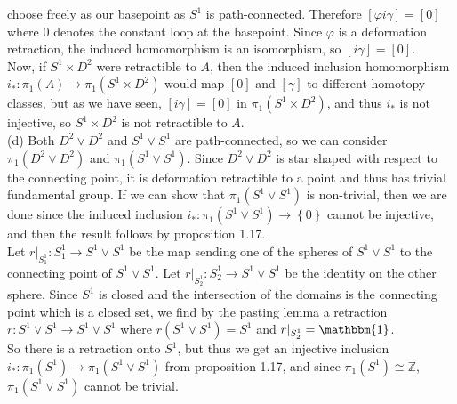 \documentclass[a4paper]{article}
\begin{document}
     choose freely as our basepoint as $S^{1}$ is path-connected. Therefore
     $\left[ \varphi i \gamma \right] = \left[ 0 \right] $ where $0$ denotes
     the constant loop at the basepoint. Since $\varphi$ is
     a deformation retraction, the induced homomorphism is an isomorphism, so
      $\left[ i \gamma \right] = \left[ 0 \right] $.\\
      Now, if $S^{1} \times D^2$ were retractible to $A$, then the induced
      inclusion homomorphism $i_*  \colon \pi_1 \left( A \right) \to \pi_1
      \left( S^{1}\times D^2 \right) $ would map $\left[ 0 \right] $ and
      $\left[ \gamma \right] $ to different homotopy classes, but as we have
      seen, $\left[ i \gamma \right] = \left[ 0 \right] $ in $\pi_1 \left(
      S^{1} \times D^2 \right) $, and thus $i_*$ is not injective, so
      $S^{1}\times D^2$ is not retractible to $A$.
    \\
     \linebreak
     (d) Both $D^2 \lor D^2$ and $S^{1} \lor S^{1}$ are path-connected, so we
     can consider $\pi_1 \left( D^2 \lor D^2 \right) $ and $\pi_1 \left( 
     S^{1} \lor S^{1} \right) $. Since $D^2 \lor D^2$ is star shaped with
     respect to the connecting point, it is deformation retractible to a point
     and thus has trivial fundamental group. If we can show that $\pi_1 \left(
     S^{1} \lor S^{1} \right) $ is non-trivial, then we are done since the
     induced inclusion  $i_*  \colon \pi_1 \left( S^{1}\lor S^{1} \right) \to
     \left\{ 0 \right\} $ cannot be injective, and then the result follows
     by proposition 1.17.\\
     \linebreak
     Let $r|_{S_1^{1}}  \colon S_1^{1} \to S^{1}\lor S^{1}$ be the map sending one of
     the spheres of $S^{1}\lor S^{1}$ to the connecting point of $S^{1}\lor
     S^{1}$. Let $r|_{S_2^{1}} \colon S_2^{1} \to S^{1}\lor S^{1}$ be the
     identity on the other sphere. Since $S^{1}$ is closed and the intersection
     of the domains is the connecting point which is a closed set, we find by
     the pasting lemma a retraction $r \colon S^{1}\lor S^{1} \to S^{1} \lor
     S^{1}$ where $r(S^{1} \lor S^{1}) = S^{1}$ and $r|_{S_2^{1}}
     = \mathbbm{1}$.\\
      So there is
     a retraction onto $S^{1}$, but thus we get an injective inclusion
     $i_*  \colon \pi_1 \left( S^{1} \right)  \to  \pi_1 \left( S^{1} \lor
     S^{1} \right) $ from proposition 1.17, and since $\pi_1 \left( S^{1} \right) \cong \mathbb{Z}$, 
     $\pi_1 \left( S^{1} \lor S^{1} \right) $ cannot be trivial.\\
\end{document}
